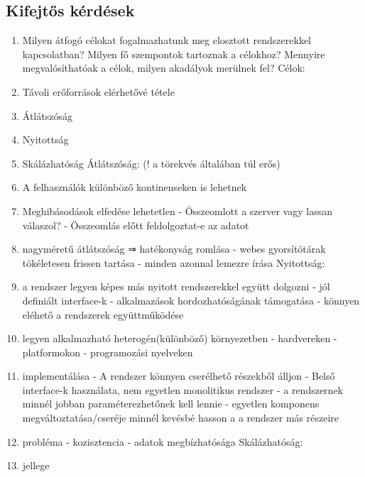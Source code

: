 \documentclass[twoside, a4paper, 12pt]{article}
\begin{document}
        \subsection{Kifejtős kérdések}
        \begin{enumerate}
            \item  Milyen átfogó célokat fogalmazhatunk meg elosztott rendszerekkel kapcsolatban? Milyen fő szempontok tartoznak a célokhoz? Mennyire megvalósíthatóak a célok, milyen akadályok merülnek fel?
                Célok:
            \item Távoli erőforrások elérhetővé tétele
            \item Átlátszóság
            \item Nyitottság
            \item Skálázhatóság
                Átlátszóság: (! a törekvés általában túl erős)
            \item A felhasználók különböző kontinenseken is lehetnek 
            \item Meghibásodások elfedése lehetetlen
                - Összeomlott a szerver vagy lassan válaszol? 
                - Összeomlás előtt feldolgoztat-e az adatot
            \item nagyméretű átlátszóság ⇒ hatékonyság romlása
                - webes gyorsítótárak tökéletesen frissen tartása
                - minden azonnal lemezre írása
                Nyitottság: 
            \item a rendszer legyen képes más nyitott rendszerekkel együtt dolgozni
                - jól definiált interface-k
                - alkalmazások hordozhatóságának támogatása
                - könnyen eléhető a rendszerek együttműködése
            \item legyen alkalmazható heterogén(különböző) környezetben
                - hardvereken
                - platformokon
                - programozási nyelveken
            \item implementálása
                - A rendszer könnyen cserélhető részekből álljon
                - Belső interface-k használata, nem egyetlen monolitikus rendszer
                - a rendszernek minnél jobban paraméterezhetőnek kell lennie
                - egyetlen komponens megváltoztatása/cseréje minnél kevésbé hasson a a rendszer más részeire
            \item probléma
                - kozisztencia
                - adatok megbízhatósága
                Skálázhatóság:
            \item jellege

\end{enumerate}
\end{document}
